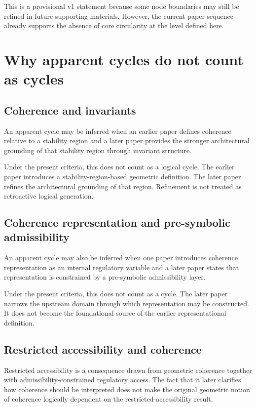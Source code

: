 \documentclass[11pt,a4paper]{article}
\begin{document}
	This is a provisional v1 statement because some node boundaries may still be refined in future
	supporting materials. However, the current paper sequence already supports the absence of core
	circularity at the level defined here.
	
	\section{Why apparent cycles do not count as cycles}
	
	\subsection{Coherence and invariants}
	
	An apparent cycle may be inferred when an earlier paper defines coherence relative to a stability
	region and a later paper provides the stronger architectural grounding of that stability region
	through invariant structure.
	
	Under the present criteria, this does not count as a logical cycle. The earlier paper introduces
	a stability-region-based geometric definition. The later paper refines the architectural grounding
	of that region. Refinement is not treated as retroactive logical generation.
	
	\subsection{Coherence representation and pre-symbolic admissibility}
	
	An apparent cycle may also be inferred when one paper introduces coherence representation as an
	internal regulatory variable and a later paper states that representation is constrained by a
	pre-symbolic admissibility layer.
	
	Under the present criteria, this does not count as a cycle. The later paper narrows the upstream
	domain through which representation may be constructed. It does not become the foundational source
	of the earlier representational definition.
	
	\subsection{Restricted accessibility and coherence}
	
	Restricted accessibility is a consequence drawn from geometric coherence together with admissibility-constrained
	regulatory access. The fact that it later clarifies how coherence should be interpreted does not make the
	original geometric notion of coherence logically dependent on the restricted-accessibility result.
	
\end{document}
